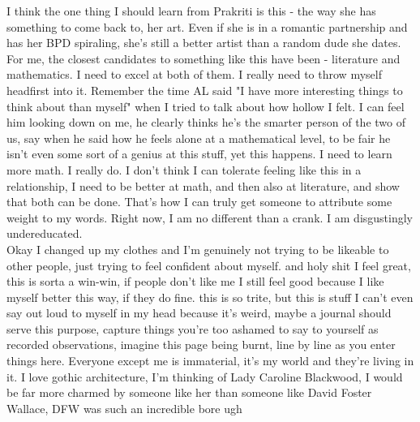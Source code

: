 \noindent {}

I think the one thing I should learn from Prakriti is this - the way she has something to come back to, her art. Even if she is in a romantic partnership and has her BPD spiraling, she's still a better artist than a random dude she dates. For me, the closest candidates to something like this have been - literature and mathematics. I need to excel at both of them. I really need to throw myself headfirst into it. Remember the time AL said "I have more interesting things to think about than myself" when I tried to talk about how hollow I felt. I can feel him looking down on me, he clearly thinks he's the smarter person of the two of us, say when he said how he feels alone at a mathematical level, to be fair he isn't even some sort of a genius at this stuff, yet this happens. I need to learn more math. I really do. I don't think I can tolerate feeling like this in a relationship, I need to be better at math, and then also at literature, and show that both can be done. That's how I can truly get someone to attribute some weight to my words. Right now, I am no different than a crank. I am disgustingly undereducated.\\

Okay I changed up my clothes and I'm genuinely not trying to be likeable to other people, just trying to feel confident about myself. and holy shit I feel great, this is sorta a win-win, if people don't like me I still feel good because I like myself better this way, if they do fine. this is so trite, but this is stuff I can't even say out loud to myself in my head because it's weird, maybe a journal should serve this purpose, capture things you're too ashamed to say to yourself as recorded observations, imagine this page being burnt, line by line as you enter things here. Everyone except me is immaterial, it's my world and they're living in it. I love gothic architecture, I'm thinking of Lady Caroline Blackwood, I would be far more charmed by someone like her than someone like David Foster Wallace, DFW was such an incredible bore ugh
